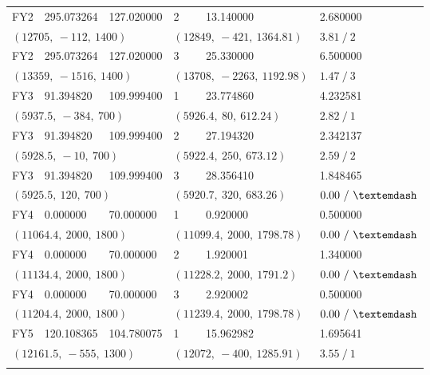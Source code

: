 \documentclass[withoutpreface,bwprint]{cumcmthesis} %
\begin{document}
\begin{longtable}{p{}p{}p{}p{}p{}p{}}
	FY2 & 295.073264 & 127.020000 & 2 & 13.140000 & 2.680000 \\
	\multicolumn{3}{l}{$(12705,\ -112,\ 1400)$} & \multicolumn{2}{l}{$(12849,\ -421,\ 1364.81)$} & $3.81\ /\ 2$ \\
	\addlinespace[2pt]
	
	FY2 & 295.073264 & 127.020000 & 3 & 25.330000 & 6.500000 \\
	\multicolumn{3}{l}{$(13359,\ -1516,\ 1400)$} & \multicolumn{2}{l}{$(13708,\ -2263,\ 1192.98)$} & $1.47\ /\ 3$ \\
	\midrule
	
	FY3 & 91.394820 & 109.999400 & 1 & 23.774860 & 4.232581 \\
	\multicolumn{3}{l}{$(5937.5,\ -384,\ 700)$} & \multicolumn{2}{l}{$(5926.4,\ 80,\ 612.24)$} & $2.82\ /\ 1$ \\
	\addlinespace[2pt]
	
	FY3 & 91.394820 & 109.999400 & 2 & 27.194320 & 2.342137 \\
	\multicolumn{3}{l}{$(5928.5,\ -10,\ 700)$} & \multicolumn{2}{l}{$(5922.4,\ 250,\ 673.12)$} & $2.59\ /\ 2$ \\
	\addlinespace[2pt]
	
	FY3 & 91.394820 & 109.999400 & 3 & 28.356410 & 1.848465 \\
	\multicolumn{3}{l}{$(5925.5,\ 120,\ 700)$} & \multicolumn{2}{l}{$(5920.7,\ 320,\ 683.26)$} & $0.00\ /\ \textemdash$ \\
	\midrule
	
	FY4 & 0.000000 & 70.000000 & 1 & 0.920000 & 0.500000 \\
	\multicolumn{3}{l}{$(11064.4,\ 2000,\ 1800)$} & \multicolumn{2}{l}{$(11099.4,\ 2000,\ 1798.78)$} & $0.00\ /\ \textemdash$ \\
	\addlinespace[2pt]
	
	FY4 & 0.000000 & 70.000000 & 2 & 1.920001 & 1.340000 \\
	\multicolumn{3}{l}{$(11134.4,\ 2000,\ 1800)$} & \multicolumn{2}{l}{$(11228.2,\ 2000,\ 1791.2)$} & $0.00\ /\ \textemdash$ \\
	\addlinespace[2pt]
	
	FY4 & 0.000000 & 70.000000 & 3 & 2.920002 & 0.500000 \\
	\multicolumn{3}{l}{$(11204.4,\ 2000,\ 1800)$} & \multicolumn{2}{l}{$(11239.4,\ 2000,\ 1798.78)$} & $0.00\ /\ \textemdash$ \\
	\midrule
	
	FY5 & 120.108365 & 104.780075 & 1 & 15.962982 & 1.695641 \\
	\multicolumn{3}{l}{$(12161.5,\ -555,\ 1300)$} & \multicolumn{2}{l}{$(12072,\ -400,\ 1285.91)$} & $3.55\ /\ 1$ \\
	\addlinespace[2pt]
	

\end{longtable}
\end{document}
